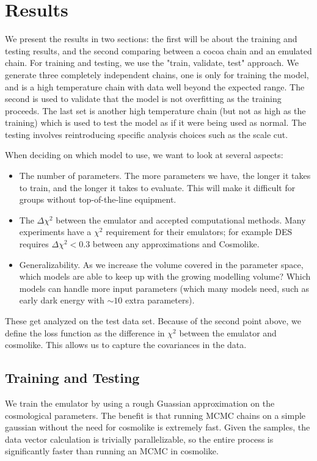 \section{Results}
We present the results in two sections: the first will be about the training and testing results, and the second comparing between a cocoa chain and an emulated chain. For training and testing, we use the "train, validate, test" approach. We generate three completely independent chains, one is only for training the model, and is a high temperature chain with data well beyond the expected range. The second is used to validate that the model is not overfitting as the training proceeds. The last set is another high temperature chain (but not as high as the training) which is used to test the model as if it were being used as normal. The testing involves reintroducing specific analysis choices such as the scale cut.

When deciding on which model to use, we want to look at several aspects:
\begin{itemize}
	\item The number of parameters. The more parameters we have, the longer it takes to train, and the longer it takes to evaluate. This will make it difficult for groups without top-of-the-line equipment.
	\item The $\Delta\chi^2$ between the emulator and accepted computational methods. Many experiments have a $\chi^2$ requirement for their emulators; for example DES requires $\Delta\chi^2<0.3$ between any approximations and Cosmolike.
	\item Generalizability. As we increase the volume covered in the parameter space, which models are able to keep up with the growing modelling volume? Which models can handle more input parameters (which many models need, such as early dark energy with $\sim10$ extra parameters).
\end{itemize}
These get analyzed on the test data set. Because of the second point above, we define the loss function as the difference in $\chi^2$ between the emulator and cosmolike. This allows us to capture the covariances in the data.
\subsection{Training and Testing}
We train the emulator by using a rough Guassian approximation on the cosmological parameters. The benefit is that running MCMC chains on a simple gaussian without the need for cosmolike is extremely fast. Given the samples, the data vector calculation is trivially parallelizable, so the entire process is significantly faster than running an MCMC in cosmolike. 

